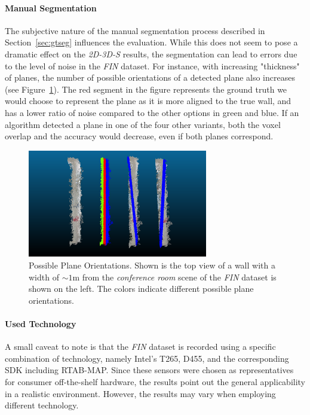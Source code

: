 \documentclass[main.tex]{subfiles}
\begin{document}
\paragraph{Manual Segmentation}
The subjective nature of the manual segmentation process described in Section~\ref{sec:gtseg} influences the evaluation. While this does not seem to pose a dramatic effect on the \textit{2D-3D-S} results, the segmentation can lead to errors due to the level of noise in the \textit{FIN} dataset. For instance, with increasing "thickness" of planes, the number of possible orientations of a detected plane also increases (see Figure~\ref{fig:poss-planes}). The red segment in the figure represents the ground truth we would choose to represent the plane as it is more aligned to the true wall, and has a lower ratio of noise compared to the other options in green and blue. If an algorithm detected a plane in one of the four other variants, both the voxel overlap and the accuracy would decrease, even if both planes correspond.

\begin{figure}[]
    \centering
    \includegraphics[width=0.7\textwidth]{images/possible_planes.png}
    \caption[Plane Orientation Ambiguity]{Possible Plane Orientations. Shown is the top view of a wall with a width of ${\sim}1$m from the \textit{conference room} scene of the \textit{FIN} dataset is shown on the left. The colors indicate different possible plane orientations.}
    \label{fig:poss-planes}
\end{figure}


\paragraph{Used Technology}
A small caveat to note is that the \textit{FIN} dataset is recorded using a specific combination of technology, namely Intel's T265, D455, and the corresponding SDK including RTAB-MAP.
Since these sensors were chosen as representatives for consumer off-the-shelf hardware, the results point out the general applicability in a realistic environment. However, the results may vary when employing different technology. 
\end{document}
